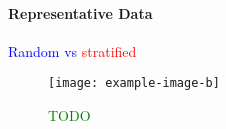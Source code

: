 \paragraph{Representative Data}

\textcolor{blue}{Random vs \textcolor{red}{stratified}}



\begin{figure}[htp]
	\centering
	\texttt{[image: example-image-b]}\hfil
	\caption{ \textcolor{green}{TODO}}
	\label{fig:stratified}
\end{figure}

